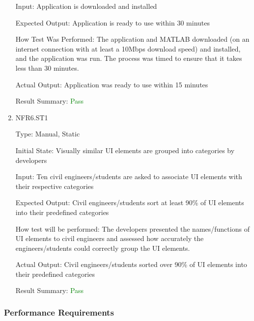 \documentclass[12pt, titlepage]{article}
\begin{document}
\begin{enumerate}
Input: Application is downloaded and installed

Expected Output: Application is ready to use within 30 minutes

How Test Was Performed: The application and MATLAB downloaded (on an internet connection with at least a 10Mbps download speed) and installed, and the application was run. The process was timed to ensure that it takes less than 30 minutes.

Actual Output: Application was ready to use within 15 minutes

Result Summary: \textcolor{green} {Pass}

\item{NFR6.ST1\\}

Type: Manual, Static

Initial State: Visually similar UI elements are grouped into categories by developers

Input: Ten civil engineers/students are asked to associate UI elements with their respective categories

Expected Output: Civil engineers/students sort at least 90\% of UI elements into their predefined categories

How test will be performed: The developers presented the names/functions of UI elements to civil engineers and assessed how accurately the engineers/students could correctly group the UI elements.

Actual Output: Civil engineers/students sorted over 90\% of UI elements into their predefined categories

Result Summary: \textcolor{green} {Pass}

\end{enumerate}

\subsubsection{Performance Requirements}
\end{document}
